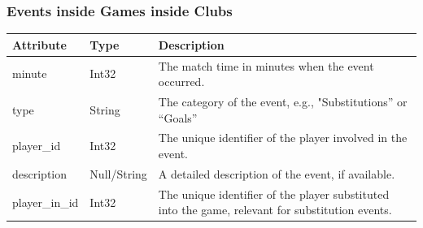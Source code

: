 \documentclass{Configuration_Files/PoliMi3i_thesis}
\begin{document}
\subsubsection{Events inside Games inside Clubs}
    \begin{tabular}{|l|l|p{8cm}|}
    \hline
    \rowcolor{bluepoli!40}
    \textbf{Attribute}    & \textbf{Type}          & \textbf{Description}                                                                 \\ \hline
    minute                & Int32                  & The match time in minutes when the event occurred.                                   \\ \hline
    type                  & String                 & The category of the event, e.g., "Substitutions” or “Goals”                         \\ \hline
    player\_id            & Int32                  & The unique identifier of the player involved in the event.                          \\ \hline
    description           & Null/String            & A detailed description of the event, if available.                                  \\ \hline
    player\_in\_id        & Int32                  & The unique identifier of the player substituted into the game, relevant for substitution events. \\ \hline
    \end{tabular}
    


    \newpage
\end{document}
